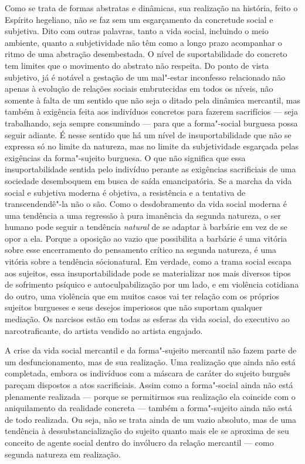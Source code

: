 Como se trata de formas abstratas e dinâmicas, sua realização na
história, feito o Espírito hegeliano, não se faz sem um esgarçamento da
concretude social e subjetiva. Dito com outras palavras, tanto a vida
social, incluindo o meio ambiente, quanto a subjetividade não têm como a
longo prazo acompanhar o ritmo de uma abstração desembestada. O nível de
suportabilidade do concreto tem limites que o movimento do abstrato não
respeita. Do ponto de vista subjetivo, já é notável a gestação de um
mal"-estar inconfesso relacionado não apenas à evolução de relações
sociais embrutecidas em todos os níveis, não somente à falta de um
sentido que não seja o ditado pela dinâmica mercantil, mas também à
exigência feita aos indivíduos concretos para fazerem sacrifícios ---
seja trabalhando, seja sempre consumindo --- para que a forma"-social
burguesa possa seguir adiante. É nesse sentido que há um nível de
insuportabilidade que não se expressa só no limite da natureza, mas no
limite da subjetividade esgarçada pelas exigências da forma"-sujeito
burguesa. O que não significa que essa insuportabilidade sentida pelo
indivíduo perante as exigências sacrificiais de uma sociedade
desemboquem em busca de saída emancipatória. Se a marcha da vida social
e subjetiva moderna é objetiva, a resistência e a tentativa de
transcendendê"-la não o são. Como o desdobramento da vida social moderna
é uma tendência a uma regressão à pura imanência da segunda natureza, o
ser humano pode seguir a tendência \emph{natural} de se adaptar à
barbárie em vez de se opor a ela. Porque a oposição ao vazio que
possibilita a barbárie é uma vitória sobre esse encerramento do
pensamento crítico na segunda natureza, é uma vitória sobre a tendência
sócionatural. Em verdade, como a trama social escapa aos sujeitos,
essa insuportabilidade pode se materializar nos mais diversos tipos de
sofrimento psíquico e autoculpabilização por um lado, e em violência
cotidiana do outro, uma violência que em muitos casos vai ter relação
com os próprios sujeitos burgueses e seus desejos imperiosos que não
suportam qualquer mediação. Os narcisos estão em todas as esferas da
vida social, do executivo ao narcotraficante, do artista vendido ao
artista engajado.

A crise da vida social mercantil e da
forma"-sujeito mercantil não fazem parte de um desfuncionamento, mas de
sua realização. Uma realização que ainda não está completada, embora os
indivíduos com a máscara de caráter do sujeito burguês pareçam dispostos
a atos sacrificiais. Assim como a forma"-social ainda
não está plenamente realizada --- porque se permitirmos sua realização
ela coincide com o aniquilamento da realidade concreta --- também a
forma"-sujeito ainda não está de todo realizada. Ou seja, não se trata
ainda de um vazio absoluto, mas de uma tendência à dessubstancialização
do sujeito quanto mais ele se aproxima de seu conceito de agente social
dentro do invólucro da relação mercantil --- como segunda natureza em
realização.

